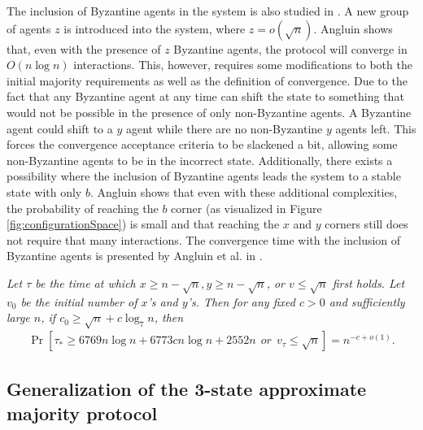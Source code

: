  The inclusion of Byzantine agents in the system is also studied in \cite{angluinSimplePopulationProtocol2008}. A new group of agents $z$ is introduced into the system, where $z = o(\sqrt{n})$. Angluin shows that, even with the presence of $z$ Byzantine agents, the protocol will converge in $O(n \log n)$ interactions. This, however, requires some modifications to both the initial majority requirements as well as the definition of convergence. Due to the fact that any Byzantine agent at any time can shift the state to something that would not be possible in the presence of only non-Byzantine agents. A Byzantine agent could shift to a $y$ agent while there are no non-Byzantine $y$ agents left. This forces the convergence acceptance criteria to be slackened a bit, allowing some non-Byzantine agents to be in the incorrect state. Additionally, there exists a possibility where the inclusion of Byzantine agents leads the system to a stable state with only $b$. Angluin shows that even with these additional complexities, the probability of reaching the $b$ corner (as visualized in Figure \ref{fig:configurationSpace}) is small and that reaching the $x$ and $y$ corners still does not require that many interactions. The convergence time with the inclusion of Byzantine agents is presented by Angluin et al. in .
 
 \begin{theorem}
    \textit{Let $\tau$ be the time at which $x \geq n - \sqrt{n}, y \geq n - \sqrt{n}$, or $v \leq \sqrt{n}$ first holds. Let $v_0$ be the initial number of $x$'s and $y$'s. Then for any fixed $c > 0$ and sufficiently large $n$, if $c_0 \geq \sqrt{n} + c \log_7n$, then} 
    \begin{align}
        \Pr [ \tau_* \geq 6769n \log n + 6773 c n \log n + 2552n \: \: or \: \: v_{\tau} \leq \sqrt{n}] = n^{-c+o(1)}.  \label{angluinTheorem4} 
    \end{align}
 \end{theorem} 
 
\subsection{Generalization of the 3-state approximate majority protocol}

